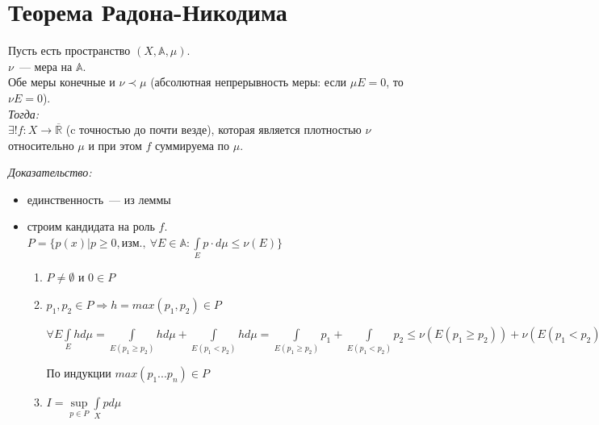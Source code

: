 \documentclass[paper=a4, fontsize=17pt]{article}
\begin{document}
\section{Теорема Радона-Никодима}
	Пусть есть пространство $(X, \mathbb{A}, \mu)$. \\
	$\nu$~--- мера на $\mathbb{A}$. \\
	Обе меры конечные и $\nu \prec \mu$ (абсолютная непрерывность меры: если $\mu E = 0$, то $\nu E = 0$). \\
	\emph{Тогда: } \\
		$\exists! f: X \rightarrow \overline{\mathds{R}}$ (c точностью до почти везде), которая является плотностью $\nu$ относительно $\mu$ и при этом $f$ суммируема по $\mu$.

	\emph{Доказательство:}
		\begin{itemize}
			\item единственность~--- из леммы
			\item строим кандидата на роль $f$. $P = \{p(x) | p \geq 0, \text{изм.},\ \forall E \in \mathbb{A} : \int\limits_E p \cdot d\mu \leq \nu(E)\}$
			\begin{enumerate}
				\item
				$P \neq \emptyset$ и $0 \in P$
				\item
				$p_1, p_2 \in P \Rightarrow h = max(p_1, p_2) \in P$

				$\forall E \int\limits_E h d\mu = \int\limits_{E(p_1 \geq p_2)} h d\mu + \int\limits_{E(p_1 < p_2)} h d\mu =
				\int\limits_{E(p_1 \geq p_2)} p_1 + \int\limits_{E(p_1 < p_2)} p_2 \leq \nu(E(p_1 \geq p_2)) + \nu(E(p_1 < p_2)) = \nu E$

				По индукции $max(p_1...p_n)\in P$
				\item
				$I = \sup\limits_{p \in P} \int\limits_X p d\mu$


\end{enumerate}
\end{itemize}
\end{document}
